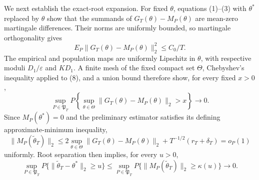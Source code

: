 We next establish the exact-root expansion. For fixed \(\theta\), equations (1)--(3) with \(\theta^*\) replaced by \(\theta\) show that the summands of \(G_T(\theta)-M_P(\theta)\) are mean-zero martingale differences. Their norms are uniformly bounded, so martingale orthogonality gives
\[
 E_P\|G_T(\theta)-M_P(\theta)\|_2^2\le C_0/T.
\tag{8}
\]
The empirical and population maps are uniformly Lipschitz in \(\theta\), with respective moduli \(D_1/\varepsilon\) and \(KD_1\). A finite mesh of the fixed compact set \(\Theta\), Chebyshev's inequality applied to (8), and a union bound therefore show, for every fixed \(x>0\),
\[
 \sup_{P\in\mathfrak P_T}P\left\{\sup_{\theta\in\Theta}
 \|G_T(\theta)-M_P(\theta)\|_2>x\right\}\longrightarrow0.
\tag{9}
\]
Since \(M_P(\theta^*)=0\) and the preliminary estimator satisfies its defining approximate-minimum inequality,
\[
 \|M_P(\widetilde\theta_T)\|_2
 \le2\sup_{\theta\in\Theta}\|G_T(\theta)-M_P(\theta)\|_2
 +T^{-1/2}(r_T+\delta_T)=o_P(1)
\tag{10}
\]
uniformly. Root separation then implies, for every \(u>0\),
\[
 \sup_{P\in\mathfrak P_T}P\{\|\widetilde\theta_T-\theta^*\|_2\ge u\}
 \le\sup_{P\in\mathfrak P_T}P\{\|M_P(\widetilde\theta_T)\|_2\ge\kappa(u)\}
 \longrightarrow0.
\tag{11}
\]

